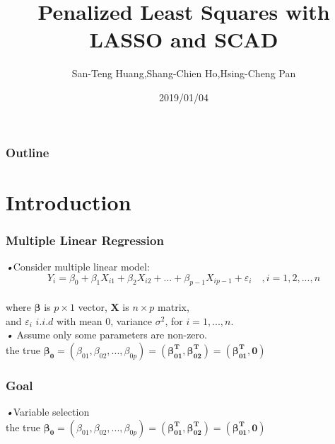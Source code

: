 \documentclass{beamer}
\title{Penalized Least Squares with LASSO and SCAD}
\author{San-Teng Huang,Shang-Chien Ho,Hsing-Cheng Pan}
\institute{National Dong Hwa University}
\date{2019/01/04}
\begin{document}
		\begin{frame}
		\titlepage
        \end{frame}
        
        \begin{frame}
		\frametitle{Outline} %
		\tableofcontents %
        \end{frame}
\section{Introduction}
    \begin{frame}
\frametitle{Multiple Linear Regression}
	\emph{•}Consider multiple linear model: 
	\begin{equation}
		Y_i =  \beta_0 + \beta_1 X_{i1} +\beta_2 X_{i2} +...+\beta_{p-1} X_{ip-1}  + \varepsilon_i \quad , i=1,2,...,n
	\end{equation} 
	\\\quad where $\boldsymbol{\beta}$ is $p \times 1$ vector, $\mathbf{X}$ is $n \times p$ matrix,
	\\\quad and $\varepsilon_i \,\, i.i.d$ with mean $0$, variance $\sigma^2$, for $i=1,...,n$.
      \\\emph{•} Assume only some parameters are non-zero.   
      \\\quad the true $\boldsymbol{\beta_0}=(\beta_{01},\beta_{02},...,\beta_{0p})=(\boldsymbol{\beta_{01}^T},\boldsymbol{\beta_{02}^T})=(\boldsymbol{\beta_{01}^T},\boldsymbol{0})$    
    \end{frame}
    
    \begin{frame}
      \frametitle{Goal}
      \large\emph{•}Variable selection  
      \\\normalsize\quad the true $\boldsymbol{\beta_0}=(\beta_{01},\beta_{02},...,\beta_{0p})=(\boldsymbol{\beta_{01}^T},\boldsymbol{\beta_{02}^T})=(\boldsymbol{\beta_{01}^T},\boldsymbol{0})$
    \end{frame}
         
\end{document}
